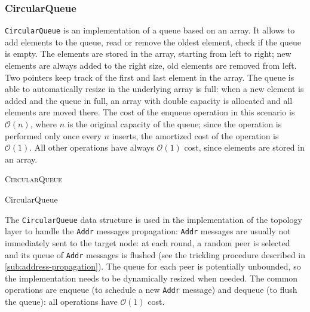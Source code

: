 \subsubsection{CircularQueue}
\texttt{CircularQueue} is an implementation of a queue based on an array.
It allows to add elements to the queue, read or remove the oldest element, check if the queue is empty.
The elements are stored in the array, starting from left to right;
new elements are always added to the right size, old elements are removed from left.
Two pointers keep track of the first and last element in the array.
The queue is able to automatically resize in the underlying array is full:
when a new element is added and the queue in full, an array with double capacity is allocated and all elements are moved there.
The cost of the enqueue operation in this scenario is $\mathcal{O}(n)$, where $n$ is the original capacity of the queue;
since the operation is performed only once every $n$ inserts, the amortized cost of the operation is $\mathcal{O}(1)$.
All other operations have always $\mathcal{O}(1)$ cost, since elements are stored in an array.

\medskip
\begin{algorithm}[h]
	\DontPrintSemicolon



	\BlankLine
	 \;
	\textsc{CircularQueue}  \;

	\BlankLine
	 \;
	\Void {} \;

	\BlankLine
	 \;
	\Object \Dequeue{} \;

	\BlankLine
	 \;
	\Object \Head{} \;

	\BlankLine
	 \;
	\Boolean \IsEmpty{} \;

	\caption{CircularQueue}
	\label{alg:circular-queue}
\end{algorithm}
\smallskip

The \texttt{CircularQueue} data structure is used in the implementation of the topology layer to handle the \texttt{Addr} messages propagation:
\texttt{Addr} messages are usually not immediately sent to the target node:
at each round, a random peer is selected and its queue of \texttt{Addr} messages is flushed (see the trickling procedure described in \cref{sub:address-propagation}).
The queue for each peer is potentially unbounded, so the implementation needs to be dynamically resized when needed.
The common operations are enqueue (to schedule a new \texttt{Addr} message) and dequeue (to flush the queue):
all operations have $\mathcal{O}(1)$ cost.

